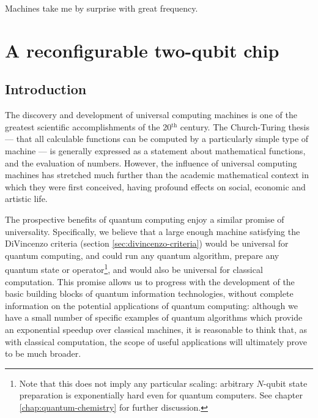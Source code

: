 \begin{savequote}[100mm] 
Machines take me by surprise with great frequency.
\end{savequote}

\chapter{A reconfigurable two-qubit chip}
\label{chap:cnot-mz}

\section{Introduction}
\label{sec:cnot-mz-intro}
The discovery and development of universal computing machines is one of the greatest scientific accomplishments of the 20$^{\text{th}}$ century. The Church-Turing thesis --- that all calculable functions can be computed by a particularly simple type of machine --- is generally expressed as a statement about mathematical functions, and the evaluation of numbers. However, the influence of universal computing machines has stretched much further than the academic mathematical context in which they were first conceived, having profound effects on social, economic and artistic life.

The prospective benefits of quantum computing enjoy a similar promise of universality. Specifically, we believe \cite{Deutsch1985} that a large enough machine satisfying the DiVincenzo criteria (section \ref{sec:divincenzo-criteria}) would be universal for quantum computing, and could run any quantum algorithm, prepare any quantum state or operator\footnote{Note that this does not imply any particular scaling: arbitrary $N$-qubit state preparation is exponentially hard even for quantum computers. See chapter \ref{chap:quantum-chemistry} for further discussion.}, and would also be universal for classical computation. This promise allows us to progress with the development of the basic building blocks of quantum information technologies, without complete information on the potential applications of quantum computing: although we have a small number of specific examples of quantum algorithms which provide an exponential speedup over classical machines, it is reasonable to think that, as with classical computation, the scope of useful applications will ultimately prove to be much broader.

